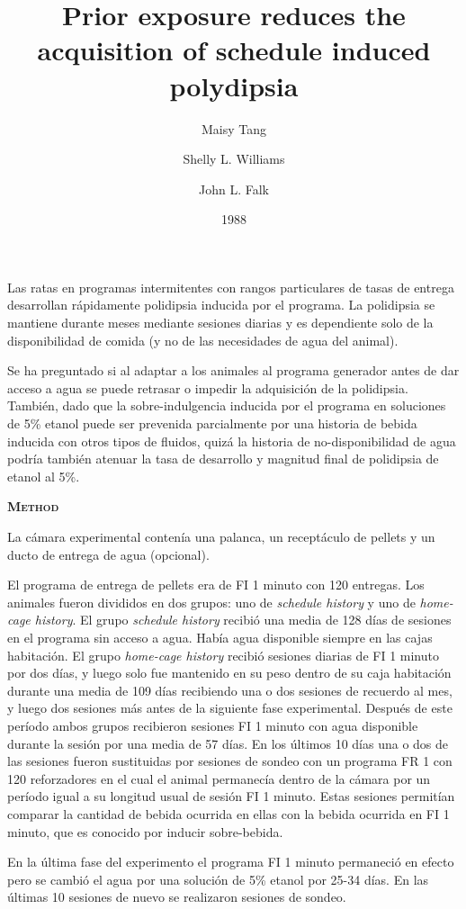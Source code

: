 \documentclass[a4paper,12pt]{article}
\title{Prior exposure reduces the acquisition of schedule induced polydipsia}
\author{Maisy Tang \and Shelly L. Williams \and John L. Falk}
\date{1988}
\begin{document}
{\scshape\bfseries \maketitle}

Las ratas en programas intermitentes con rangos particulares de tasas de entrega desarrollan rápidamente polidipsia inducida por el programa. La polidipsia se mantiene durante meses mediante sesiones diarias y es dependiente solo de la disponibilidad de comida (y no de las necesidades de agua del animal).

Se ha preguntado si al adaptar a los animales al programa generador antes de dar acceso a agua se puede retrasar o impedir la adquisición de la polidipsia. También, dado que la sobre-indulgencia inducida por el programa en soluciones de 5\% etanol puede ser prevenida parcialmente por una historia de bebida inducida con otros tipos de fluidos, quizá la historia de no-disponibilidad de agua podría también atenuar la tasa de desarrollo y magnitud final de polidipsia de etanol al 5\%.

{\scshape\bfseries Method}

La cámara experimental contenía una palanca, un receptáculo de pellets y un ducto de entrega de agua (opcional).

El programa de entrega de pellets era de FI 1 minuto con 120 entregas. Los animales fueron divididos en dos grupos: uno de {\itshape schedule history} y uno de {\itshape home-cage history}. El grupo {\itshape schedule history} recibió una media de 128 días de sesiones en el programa sin acceso a agua. Había agua disponible siempre en las cajas habitación. El grupo {\itshape home-cage history} recibió sesiones diarias de FI 1 minuto por dos días, y luego solo fue mantenido en su peso dentro de su caja habitación durante una media de 109 días recibiendo una o dos sesiones de recuerdo al mes, y luego dos sesiones más antes de la siguiente fase experimental. Después de este período ambos grupos recibieron sesiones FI 1 minuto con agua disponible durante la sesión por una media de 57 días. En los últimos 10 días una o dos de las sesiones fueron sustituidas por sesiones de sondeo con un programa FR 1 con 120 reforzadores en el cual el animal permanecía dentro de la cámara por un período igual a su longitud usual de sesión FI 1 minuto. Estas sesiones permitían comparar la cantidad de bebida ocurrida en ellas con la bebida ocurrida en FI 1 minuto, que es conocido por inducir sobre-bebida.

En la última fase del experimento el programa FI 1 minuto permaneció en efecto pero se cambió el agua por una solución de 5\% etanol por 25-34 días. En las últimas 10 sesiones de nuevo se realizaron sesiones de sondeo.
\end{document}
